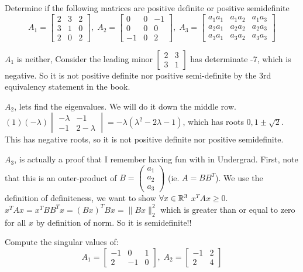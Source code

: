 \documentclass[11pt]{article}
\begin{document}
Determine if the following matrices are positive definite or positive semidefinite
$$
A_1 = \begin{bmatrix}
    2 & 3 & 2 \\ 3 & 1 & 0 \\ 2 & 0 & 2
\end{bmatrix}, \; A_2 = \begin{bmatrix}
    0 & 0 & -1 \\ 0 & 0 & 0 \\ -1 & 0 & 2
\end{bmatrix}, \; A_3 = \begin{bmatrix}
    a_1a_1 & a_1 a_2 & a_1 a_3 \\
    a_2 a_1 & a_2 a_2 & a_2 a_3 \\
    a_3 a_1 & a_3 a_2 & a_3 a_3
\end{bmatrix}
$$

\soln

$A_1$ is neither, Consider the leading minor $\begin{bmatrix}
    2 & 3 \\ 3 & 1
\end{bmatrix}$ has determinate -7, which is negative.
So it is not positive definite nor positive semi-definite by the 3rd equivalency statement in the book.

$A_2$, lets find the eigenvalues. We will do it down the middle row.
$(1)(-\lambda) \begin{vmatrix}
    -\lambda & -1\\ -1 & 2- \lambda
\end{vmatrix} = -\lambda(\lambda^2 - 2 \lambda - 1)$, which has roots $0, 1 \pm \sqrt{2}$.
This has negative roots, so it is not positive definite nor positive semidefinite.

$A_3$, is actually a proof that I remember having fun with in Undergrad.
First, note that this is an outer-product of $B = \begin{pmatrix}
    a_1 \\ a_2 \\ a_3
\end{pmatrix}$ (ie. $A = BB^T$).
We use the definition of definiteness, we want to show 
$\forall x \in \mathbb{R}^3$ $x^T A x \geq 0$.
$x^T A x = x^T B B^T x = (Bx)^TBx = \lVert Bx \rVert _2^2$
which is greater than or equal to zero for all $x$ by definition of norm.
So it is semidefinite!!


Compute the singular values of:
$$
A_1 = \begin{bmatrix}
    -1 & 0 & 1\\2 & -1 & 0
\end{bmatrix}, \; A_2 = \begin{bmatrix}
    -1 & 2 \\ 2 & 4
\end{bmatrix}
$$
\end{document}
